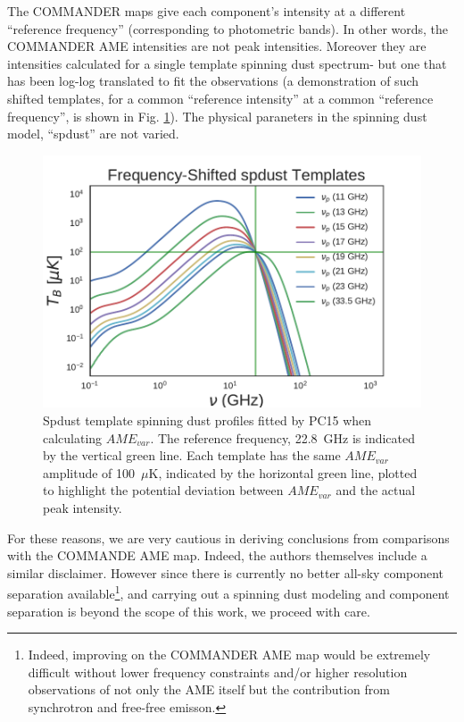         The COMMANDER maps give each component's intensity at a different ``reference frequency'' (corresponding to photometric bands). In other words, the COMMANDER AME intensities are not peak intensities. Moreover they are intensities calculated for a single template spinning dust spectrum- but one that has been log-log translated to fit the observations (a demonstration of such shifted templates, for a common ``reference intensity'' at a common ``reference frequency'', is shown in Fig. \ref{fig:AME_commander_freqshift_templ}). The physical paraneters in the spinning dust model, ``spdust'' are not varied.

        \begin{figure}
          \label{fig:AME_commander_freqshift_templ}
          \includegraphics[width=\textwidth]{../Plots/ch_datasources/AME_commander_freqshift_templ.pdf}
          \centering
          \caption{Spdust template spinning dust profiles fitted by PC15 when calculating $AME_{var}$.  The reference frequency, 22.8~GHz is indicated by the vertical green line. Each template has the same $AME_{var}$ amplitude of 100~$\mu$K, indicated by the horizontal green line, plotted to highlight the potential deviation between $AME_{var}$ and the actual peak intensity. }
        \end{figure}

        For these reasons, we are very cautious in deriving conclusions from comparisons with the COMMANDE AME map. Indeed, the authors themselves include a similar disclaimer. However since there is currently no better all-sky component separation available\footnote{Indeed, improving on the COMMANDER AME map would be extremely difficult without lower frequency constraints and/or higher resolution observations of not only the AME itself but the contribution from synchrotron and free-free emisson.}, and carrying out a spinning dust modeling and component separation is beyond the scope of this work, we proceed with care.


